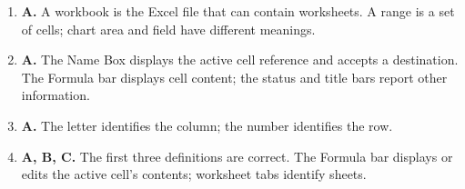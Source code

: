 \begin{enumerate}[label=\textbf{Q\arabic*.}, leftmargin=*]
\item \textbf{A.} A workbook is the Excel file that can contain worksheets. A range is a set of cells; chart area and field have different meanings.

\item \textbf{A.} The Name Box displays the active cell reference and accepts a destination. The Formula bar displays cell content; the status and title bars report other information.

\item \textbf{A.} The letter identifies the column; the number identifies the row.

\item \textbf{A, B, C.} The first three definitions are correct. The Formula bar displays or edits the active cell's contents; worksheet tabs identify sheets.

\end{enumerate}
